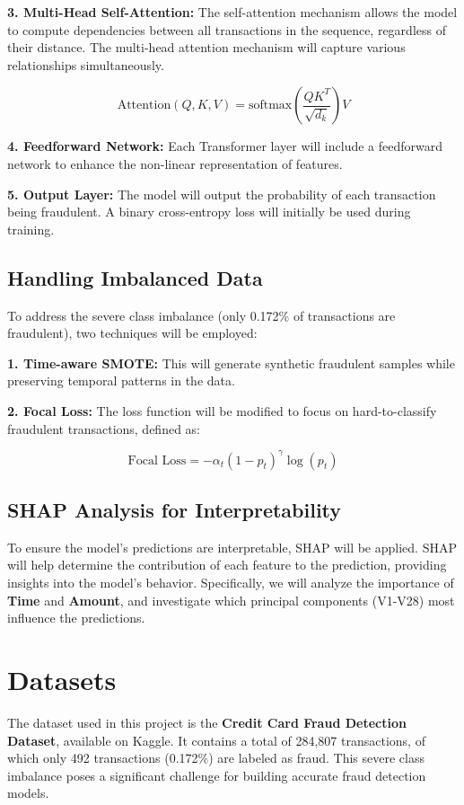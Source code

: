 \documentclass[11pt, oneside]{article}   	%
\begin{document}
\textbf{3. Multi-Head Self-Attention:} The self-attention mechanism allows the model to compute dependencies between all transactions in the sequence, regardless of their distance. The multi-head attention mechanism will capture various relationships simultaneously.

\[
\text{Attention}(Q, K, V) = \text{softmax} \left( \frac{QK^T}{\sqrt{d_k}} \right) V
\]

\textbf{4. Feedforward Network:} Each Transformer layer will include a feedforward network to enhance the non-linear representation of features.

\textbf{5. Output Layer:} The model will output the probability of each transaction being fraudulent. A binary cross-entropy loss will initially be used during training.

\subsection{Handling Imbalanced Data}

To address the severe class imbalance (only 0.172\% of transactions are fraudulent), two techniques will be employed:

\textbf{1. Time-aware SMOTE:} This will generate synthetic fraudulent samples while preserving temporal patterns in the data.

\textbf{2. Focal Loss:} The loss function will be modified to focus on hard-to-classify fraudulent transactions, defined as:

\[
\text{Focal Loss} = -\alpha_t (1 - p_t)^\gamma \log(p_t)
\]

\subsection{SHAP Analysis for Interpretability}

To ensure the model's predictions are interpretable, SHAP will be applied. SHAP will help determine the contribution of each feature to the prediction, providing insights into the model's behavior. Specifically, we will analyze the importance of \textbf{Time} and \textbf{Amount}, and investigate which principal components (V1-V28) most influence the predictions.


\section{Datasets}

The dataset used in this project is the \textbf{Credit Card Fraud Detection Dataset}, available on Kaggle. It contains a total of 284,807 transactions, of which only 492 transactions (0.172\%) are labeled as fraud. This severe class imbalance poses a significant challenge for building accurate fraud detection models.
\end{document}
